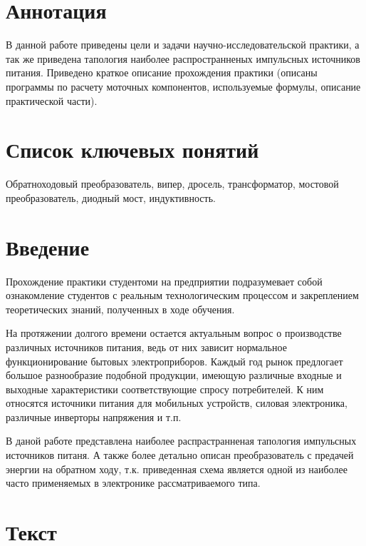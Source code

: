 




\setcounter{page}{3}

\section*{Аннотация}

	В данной работе приведены цели и задачи научно-исследовательской практики, а так же приведена тапология наиболее распространненых импульсных источников питания. Приведено краткое описание прохождения практики (описаны программы по расчету моточных компонентов, используемые формулы, описание практической части).

\section*{Список ключевых понятий}

Обратноходовый преобразователь, випер, дросель, трансформатор, мостовой преобразователь, диодный мост, индуктивность.

\newpage

\tableofcontents
\newpage

\section{Введение}

	Прохождение практики студентоми на предприятии подразумевает собой ознакомление студентов с реальным технологическим процессом и закреплением теоретических знаний, полученных в ходе обучения.
	
	На протяжении долгого времени остается актуальным вопрос о производстве различных источников питания, ведь от них зависит нормальное функционирование бытовых электроприборов. Каждый год рынок предлогает большое разнообразие подобной продукции, имеющую различные входные и выходные характеристики соответствующие спросу потребителей. К ним относятся источники питания для мобильных устройств, силовая электроника, различные инверторы напряжения и т.п.
	
	В даной работе представлена наиболее распрастранненая тапология импульсных источников питаня. А также более детально описан преобразователь с предачей энергии на обратном ходу, т.к. приведенная схема является одной из наиболее часто применяемых в электронике рассматриваемого типа.

\section{Текст}

